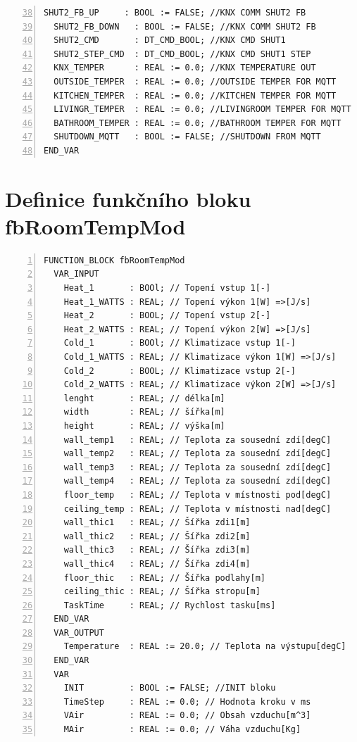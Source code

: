 \begin{lstlisting}[language=ST, breaklines=true, numbers=left, firstnumber=38, numberstyle=\small, numbersep=10pt, frame=single, basicstyle=\ttfamily\small]
  SHUT2_FB_UP     : BOOL := FALSE; //KNX COMM SHUT2 FB
  SHUT2_FB_DOWN   : BOOL := FALSE; //KNX COMM SHUT2 FB
  SHUT2_CMD       : DT_CMD_BOOL; //KNX CMD SHUT1
  SHUT2_STEP_CMD  : DT_CMD_BOOL; //KNX CMD SHUT1 STEP
  KNX_TEMPER      : REAL := 0.0; //KNX TEMPERATURE OUT
  OUTSIDE_TEMPER  : REAL := 0.0; //OUTSIDE TEMPER FOR MQTT
  KITCHEN_TEMPER  : REAL := 0.0; //KITCHEN TEMPER FOR MQTT
  LIVINGR_TEMPER  : REAL := 0.0; //LIVINGROOM TEMPER FOR MQTT
  BATHROOM_TEMPER : REAL := 0.0; //BATHROOM TEMPER FOR MQTT
  SHUTDOWN_MQTT   : BOOL := FALSE; //SHUTDOWN FROM MQTT
END_VAR
\end{lstlisting}
\chapter{Definice funkčního bloku fbRoomTempMod}
\label{apend:fbRoomTempMod}
\begin{lstlisting}[language=ST, breaklines=true, numbers=left, numberstyle=\small, numbersep=10pt, frame=single, basicstyle=\ttfamily\small, caption={Definice funkčního bloku fbRoomTempMod}, label={lst:fbRoomTempMod}]
FUNCTION_BLOCK fbRoomTempMod
  VAR_INPUT
    Heat_1       : BOOl; // Topení vstup 1[-]
    Heat_1_WATTS : REAL; // Topení výkon 1[W] =>[J/s]
    Heat_2       : BOOL; // Topení vstup 2[-]
    Heat_2_WATTS : REAL; // Topení výkon 2[W] =>[J/s]
    Cold_1       : BOOl; // Klimatizace vstup 1[-]
    Cold_1_WATTS : REAL; // Klimatizace výkon 1[W] =>[J/s]
    Cold_2       : BOOL; // Klimatizace vstup 2[-]
    Cold_2_WATTS : REAL; // Klimatizace výkon 2[W] =>[J/s]
    lenght       : REAL; // délka[m]
    width        : REAL; // šířka[m]
    height       : REAL; // výška[m]
    wall_temp1   : REAL; // Teplota za sousední zdí[degC]
    wall_temp2   : REAL; // Teplota za sousední zdí[degC]
    wall_temp3   : REAL; // Teplota za sousední zdí[degC]
    wall_temp4   : REAL; // Teplota za sousední zdí[degC]
    floor_temp   : REAL; // Teplota v místnosti pod[degC]
    ceiling_temp : REAL; // Teplota v místnosti nad[degC]
    wall_thic1   : REAL; // Šířka zdi1[m]
    wall_thic2   : REAL; // Šířka zdi2[m]
    wall_thic3   : REAL; // Šířka zdi3[m]
    wall_thic4   : REAL; // Šířka zdi4[m]
    floor_thic   : REAL; // Šířka podlahy[m]
    ceiling_thic : REAL; // Šířka stropu[m]
    TaskTime     : REAL; // Rychlost tasku[ms]
  END_VAR
  VAR_OUTPUT
    Temperature  : REAL := 20.0; // Teplota na výstupu[degC]
  END_VAR
  VAR
    INIT         : BOOL := FALSE; //INIT bloku
    TimeStep     : REAL := 0.0; // Hodnota kroku v ms
    VAir         : REAL := 0.0; // Obsah vzduchu[m^3]
    MAir         : REAL := 0.0; // Váha vzduchu[Kg]
\end{lstlisting}
